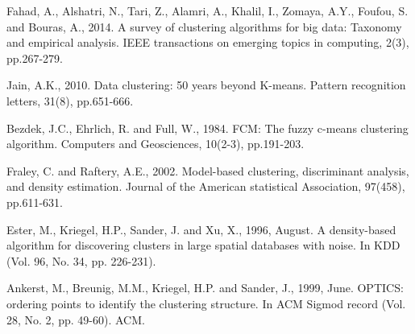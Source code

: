 \documentclass[conference]{IEEEtran}
\begin{document}

%
%
%
\begin{thebibliography}{}

Fahad, A., Alshatri, N., Tari, Z., Alamri, A., Khalil, I., Zomaya, A.Y., Foufou, S. and Bouras, A., 2014. A survey of clustering algorithms for big data: Taxonomy and empirical analysis. IEEE transactions on emerging topics in computing, 2(3), pp.267-279.

Jain, A.K., 2010. Data clustering: 50 years beyond K-means. Pattern recognition letters, 31(8), pp.651-666.

Bezdek, J.C., Ehrlich, R. and Full, W., 1984. FCM: The fuzzy c-means clustering algorithm. Computers and Geosciences, 10(2-3), pp.191-203.

Fraley, C. and Raftery, A.E., 2002. Model-based clustering, discriminant analysis, and density estimation. Journal of the American statistical Association, 97(458), pp.611-631.

Ester, M., Kriegel, H.P., Sander, J. and Xu, X., 1996, August. A density-based algorithm for discovering clusters in large spatial databases with noise. In KDD (Vol. 96, No. 34, pp. 226-231).

Ankerst, M., Breunig, M.M., Kriegel, H.P. and Sander, J., 1999, June. OPTICS: ordering points to identify the clustering structure. In ACM Sigmod record (Vol. 28, No. 2, pp. 49-60). ACM.


\end{thebibliography}
\end{document}
